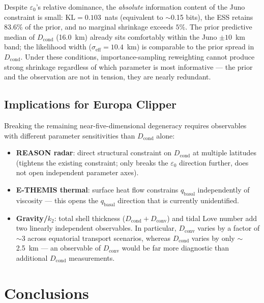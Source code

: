 \documentclass[11pt,a4paper]{article}
\begin{document}
Despite $\varepsilon_0$'s relative dominance, the \emph{absolute} information
content of the Juno constraint is small: $\mathrm{KL} = 0.103$~nats
(equivalent to $\sim$0.15 bits), the ESS retains 83.6\% of the prior, and
no marginal shrinkage exceeds $5\%$.  The prior predictive median of
$D_\mathrm{cond}$ (16.0~km) already sits comfortably within the Juno
$\pm 10$~km band; the likelihood width ($\sigma_\mathrm{eff} = 10.4$~km)
is comparable to the prior spread in $D_\mathrm{cond}$.  Under these
conditions, importance-sampling reweighting cannot produce strong shrinkage
regardless of which parameter is most informative --- the prior and the
observation are not in tension, they are nearly redundant.

\subsection{Implications for Europa Clipper}

Breaking the remaining near-five-dimensional degeneracy requires observables
with different parameter sensitivities than $D_\mathrm{cond}$ alone:

\begin{itemize}
\item \textbf{REASON radar}: direct structural constraint on $D_\mathrm{cond}$
  at multiple latitudes (tightens the existing constraint; only breaks the
  $\varepsilon_0$ direction further, does not open independent parameter axes).
\item \textbf{E-THEMIS thermal}: surface heat flow constrains $q_\mathrm{basal}$
  independently of viscosity --- this opens the $q_\mathrm{basal}$ direction
  that is currently unidentified.
\item \textbf{Gravity/$k_2$}: total shell thickness ($D_\mathrm{cond} + D_\mathrm{conv}$)
  and tidal Love number add two linearly independent observables.  In particular,
  $D_\mathrm{conv}$ varies by a factor of $\sim$3 across equatorial transport
  scenarios, whereas $D_\mathrm{cond}$ varies by only $\sim$2.5~km --- an
  observable of $D_\mathrm{conv}$ would be far more diagnostic than additional
  $D_\mathrm{cond}$ measurements.
\end{itemize}

\section{Conclusions}
\end{document}
